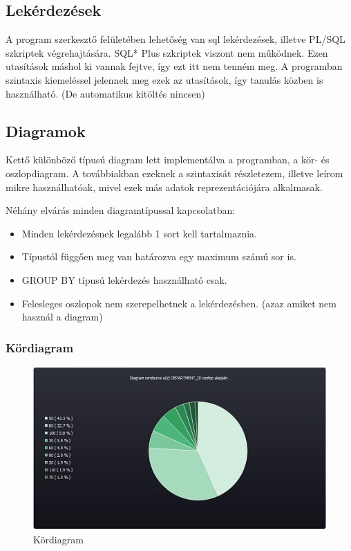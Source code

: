 \documentclass{elteikthesis}
\begin{document}
\subsection{Lekérdezések}
A program szerkesztő felületében lehetőség van sql lekérdezések, illetve PL/SQL szkriptek végrehajtására. SQL* Plus szkriptek viszont
nem működnek. Ezen utasítások máshol ki vannak fejtve, így ezt itt nem tenném meg. A programban szintaxis kiemeléssel jelennek meg ezek
az utasítások, így tanulás közben is használható. (De automatikus kitöltés nincsen)

\subsection{Diagramok}
Kettő különböző típusú diagram lett implementálva a programban, a kör- és oszlopdiagram. A továbbiakban
ezeknek a szintaxisát részletezem, illetve leírom mikre használhatóak, mivel ezek más adatok
reprezentációjára alkalmasak.

Néhány elvárás minden diagramtípussal kapcsolatban:
\begin{itemize}
  \item Minden lekérdezésnek legalább 1 sort kell tartalmaznia.
  \item Típustól függően meg van határozva egy maximum számú sor is.
  \item GROUP BY típusú lekérdezés használható csak.
  \item Felesleges oszlopok nem szerepelhetnek a lekérdezésben. (azaz amiket nem használ a diagram)
\end{itemize}

\subsubsection{Kördiagram}
\begin{figure}[ht]
  \begin{center}
    \includegraphics{piechart}
  \end{center}
 \caption{Kördiagram}
\end{figure}
\end{document}
